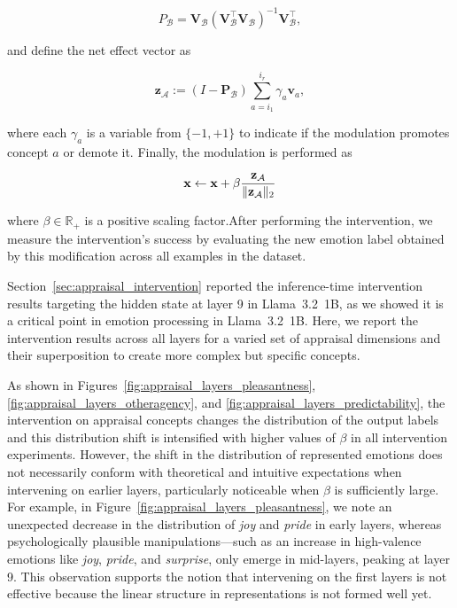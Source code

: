 \[
P_{\mathcal{B}} = \mathbf{V}_{\mathcal{B}}(\mathbf{V}_{\mathcal{B}}^\top \mathbf{V}_{\mathcal{B}})^{-1} \mathbf{V}_{\mathcal{B}}^\top,
\]

and define the net effect vector as 

\[
    \mathbf{z}_{\mathcal{A}} := (I - \mathbf{P}_{\mathcal{B}})\sum_{a=i_1}^{i_r} \gamma_a \mathbf{v}_a,
\]

where each $\gamma_a$ is a variable from $\{-1, +1\}$ to indicate if the modulation promotes concept $a$ or demote it. Finally, the modulation is performed as

$$\mathbf{x} \leftarrow \mathbf{x} + \beta \frac{\mathbf{z}_{\mathcal{A}}}{\lVert\mathbf{z}_{\mathcal{A}}\rVert_2}$$

where $\beta \in \mathbb{R}_+$ is a positive scaling factor.After performing the intervention, we measure the intervention's success by evaluating the new emotion label obtained by this modification across all examples in the dataset.

Section~\ref{sec:appraisal_intervention} reported the inference-time intervention results targeting the hidden state at layer 9 in Llama~3.2~1B, as we showed it is a critical point in emotion processing in Llama~3.2~1B. Here, we report the intervention results across all layers for a varied set of appraisal dimensions and their superposition to create more complex but specific concepts. 

As shown in Figures~\ref{fig:appraisal_layers_pleasantness}, \ref{fig:appraisal_layers_otheragency}, and \ref{fig:appraisal_layers_predictability}, the intervention on appraisal concepts changes the distribution of the output labels and this distribution shift is intensified with higher values of
\( \beta \) in all intervention experiments. However, the shift in the distribution of represented emotions does not necessarily conform with theoretical and intuitive expectations when intervening on earlier layers, particularly noticeable when \( \beta \) is sufficiently large. For example, in Figure~\ref{fig:appraisal_layers_pleasantness}, we note an unexpected decrease in the distribution of \textit{joy} and \textit{pride} in early layers, whereas psychologically plausible manipulations—such as an increase in high-valence emotions like \textit{joy}, \textit{pride}, and \textit{surprise}, only emerge in mid-layers, peaking at layer 9. This observation supports the notion that intervening on the first layers is not effective because the linear structure in representations is not formed well yet. 

